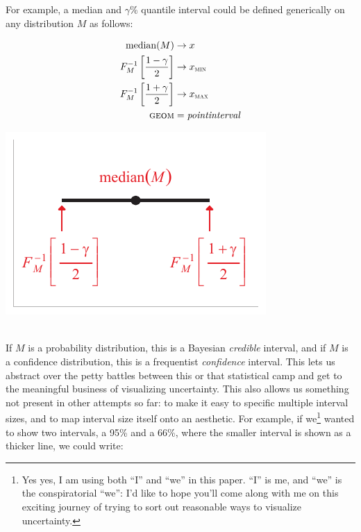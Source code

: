 \documentclass[journal]{vgtc}                     %
\newcommand{\equationfigure}[2]{%
\noindent
\begin{minipage}{.5\columnwidth}
\setlength{\abovedisplayskip}{0pt} %
\setlength{\belowdisplayskip}{0pt} %
#1\end{minipage}%
\begin{minipage}{.4\columnwidth}\centering #2 \end{minipage}%
\vspace{.5\belowdisplayskip}\\
}
\begin{document}
For example, a median and $\gamma\%$ quantile interval could be defined generically on any distribution $M$ as follows:

\equationfigure{
\begin{align*}
\operatorname{median}(M) &\rightarrow x\\
F_M^{-1}\left[\frac{1 - \gamma}{2}\right] &\rightarrow x_\textsc{min}\\
F_M^{-1}\left[\frac{1 + \gamma}{2}\right] &\rightarrow x_\textsc{max}\\
\textsc{geom} &= \mathit{pointinterval}
\end{align*}
}{\includegraphics[width=1.2\columnwidth]{figs/3-geom_pointinterval_quantiles.pdf}}
If $M$ is a probability distribution, this is a Bayesian \textit{credible }interval, and if $M$ is a confidence distribution, this is a frequentist \textit{confidence} interval. This lets us abstract over the petty battles between this or that statistical camp and get to the meaningful business of visualizing uncertainty. This also allows us something not present in other attempts so far: to make it easy to specific multiple interval sizes, and to map interval size itself onto an aesthetic. For example, if we\footnote{Yes yes, I am using both ``I'' and ``we'' in this paper. ``I'' is me, and ``we'' is the conspiratorial ``we'': I'd like to hope you'll come along with me on this exciting journey of trying to sort out reasonable ways to visualize uncertainty.} wanted to show two intervals, a 95\% and a 66\%, where the smaller interval is shown as a thicker line, we could write:
\end{document}
